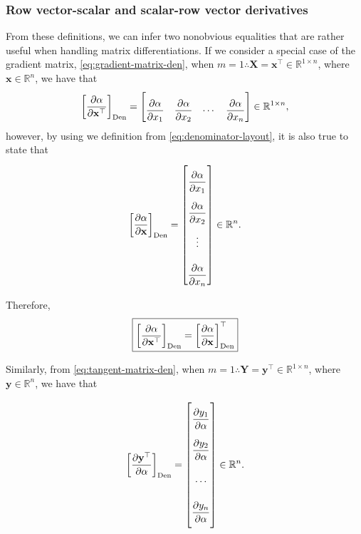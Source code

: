 \documentclass{article}
\begin{document}
\subsubsection{Row vector-scalar and scalar-row vector derivatives}

From these definitions, we can infer two nonobvious equalities that are rather useful when handling matrix differentiations. If we consider a special case of the gradient matrix, \eqref{eq:gradient-matrix-den}, when $m=1 \therefore \mathbf{X} = \mathbf{x}^\top \in \mathbb{R}^{1\times n}$, where $\mathbf{x} \in \mathbb{R}^n$, we have that
\begin{align}
    \left[\dfrac{\partial \alpha}{\partial \mathbf{x}^\top}\right]_{\textnormal{Den}} = \begin{bmatrix} \dfrac{\partial \alpha}{\partial x_{1}} &
        \dfrac{\partial \alpha}{\partial x_{2}} &
        \cdots &
        \dfrac{\partial \alpha}{\partial x_{n}} \end{bmatrix} \in \mathbb{R}^{1\times n},
\end{align}
however, by using we definition from \eqref{eq:denominator-layout}, it is also true to state that
\begin{align}
    \left[\dfrac{\partial \alpha}{\partial \mathbf{x}}\right]_{\textnormal{Den}} = \begin{bmatrix} \dfrac{\partial \alpha}{\partial x_{1}} \\
        \dfrac{\partial \alpha}{\partial x_{2}} \\
        \vdots \\
        \dfrac{\partial \alpha}{\partial x_{n}} \end{bmatrix} \in \mathbb{R}^{n}.
\end{align}

Therefore,
\begin{align}
    \label{eq:hidden-den}
    \boxed{\left[\dfrac{\partial \alpha}{\partial \mathbf{x}^\top}\right]_{\textnormal{Den}} = \left[\dfrac{\partial \alpha}{\partial \mathbf{x}}\right]_{\textnormal{Den}}^\top}
\end{align}

Similarly, from \eqref{eq:tangent-matrix-den}, when $m=1 \therefore \mathbf{Y} = \mathbf{y}^\top \in \mathbb{R}^{1\times n}$, where $\mathbf{y} \in \mathbb{R}^n$, we have that

\begin{align}
    \left[\dfrac{\partial \mathbf{y}^\top}{\partial \alpha}\right]_{\textnormal{Den}} = \renewcommand{\arraystretch}{2.6}\begin{bmatrix}
        \dfrac{\partial y_{1}}{\partial \alpha} \\
        \dfrac{\partial y_{2}}{\partial \alpha} \\
        \cdots \\
        \dfrac{\partial y_{n}}{\partial \alpha}\vspace{1.3ex}
    \end{bmatrix} \in \mathbb{R}^{n}.
\end{align}
\end{document}
